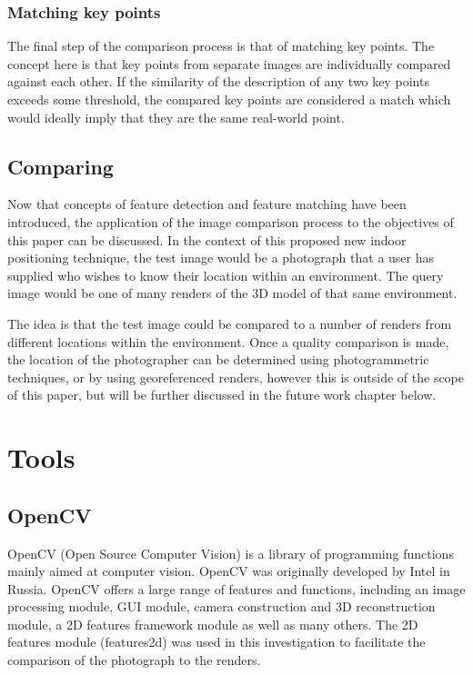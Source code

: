 \documentclass[11pt,a4paper]{report}
\begin{document}
			\subsubsection{Matching key points}
				The final step of the comparison process is that of matching key points. The concept here is that key points from separate images are individually compared against each other. If the similarity of the description of any two key points exceeds some threshold, the compared key points are considered a match which would ideally imply that they are the same real-world point.
		
		\subsection{Comparing}
			Now that concepts of feature detection and feature matching have been introduced, the application of the image comparison process to the objectives of this paper can be discussed.
			In the context of this proposed new indoor positioning technique, the test image would be a photograph that a user has supplied who wishes to know their location within an environment. The query image would be one of many renders of the 3D model of that same environment.
			
			The idea is that the test image could be compared to a number of renders from different locations within the environment. Once a quality comparison is made, the location of the photographer can be determined using photogrammetric techniques, or by using georeferenced renders, however this is outside of the scope of this paper, but will be further discussed in the future work chapter below.
	
	\section{Tools}
		\subsection{OpenCV}
			OpenCV (Open Source Computer Vision) is a library of programming functions mainly aimed at computer vision. OpenCV was originally developed by Intel in Russia. OpenCV offers a large range of features and functions, including an image processing module, GUI module, camera construction and 3D reconstruction module, a 2D features framework module as well as many others. The 2D features module (features2d) was used in this investigation to facilitate the comparison of the photograph to the renders. 
\end{document}
